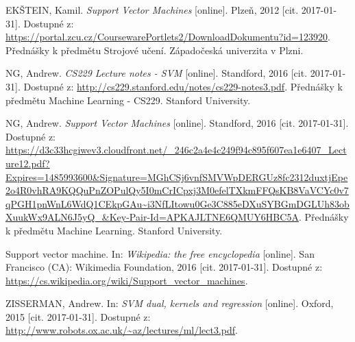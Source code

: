 \documentclass[a4]{article}
\begin{document}
\appendix
\begin{thebibliography}{99}

EKŠTEIN, Kamil. \textit{Support Vector Machines} [online]. Plzeň, 2012 [cit. 2017-01-31]. Dostupné z: \url{https://portal.zcu.cz/CoursewarePortlets2/DownloadDokumentu?id=123920}. Přednášky k předmětu Strojové učení. Západočeská univerzita v Plzni.

NG, Andrew. \textit{CS229 Lecture notes - SVM} [online]. Standford, 2016 [cit. 2017-01-31]. Dostupné z: \url{http://cs229.stanford.edu/notes/cs229-notes3.pdf}. Přednášky k předmětu Machine Learning - CS229. Stanford University.

NG, Andrew. \textit{Support Vector Machines} [online]. Standford, 2016 [cit. 2017-01-31]. Dostupné z: \url{https://d3c33hcgiwev3.cloudfront.net/_246c2a4e4c249f94c895f607ea1e6407_Lecture12.pdf?Expires=1485993600&Signature=MGhCSj6vnfSMVWpDERGUz8fc2312duxtjEpe2o4R0vhRA9KQQuPnZOPulQy5I0mCrICpxj3M0efelTXkmFFQsKB8VaVCYc0v7qPGH1pnWnL6WdQ1CEkpGAu~i3NfLItowu0Ge3C885eDXuSYBGmDGLUh83obXuukWx9ALN6J5yQ_&Key-Pair-Id=APKAJLTNE6QMUY6HBC5A}. Přednášky k předmětu Machine Learning. Stanford University.

Support vector machine. In: \textit{Wikipedia: the free encyclopedia} [online]. San Francisco (CA): Wikimedia Foundation, 2016 [cit. 2017-01-31]. Dostupné z: \url{https://cs.wikipedia.org/wiki/Support_vector_machines}.

ZISSERMAN, Andrew. In: \textit{SVM dual, kernels and regression} [online]. Oxford, 2015 [cit. 2017-01-31]. Dostupné z: \url{http://www.robots.ox.ac.uk/~az/lectures/ml/lect3.pdf}.

\end{thebibliography}
\end{document}
